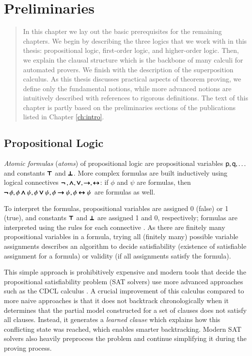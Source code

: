 \chapter{Preliminaries}
\label{ch:pre}

\begin{abstract}
    In this chapter we lay out the basic prerequisites for the remaining
    chapters. We begin by describing the three logics that we work with in this
    thesis: propositional logic, first-order logic, and higher-order logic. Then,
    we explain the clausal structure which is the backbone of many calculi for
    automated provers. We finish with the description of the superposition
    calculus. As this thesis discusses practical aspects of theorem proving, we
    define only the fundamental notions, while more advanced notions are
    intuitively described with references to rigorous definitions. The text of
    this chapter is partly based on the preliminaries sections of the
    publications listed in Chapter \ref{ch:intro}.
\end{abstract}
      
\newpage


\section{Propositional Logic}

\emph{Atomic formulas} (\emph{atoms}) of propositional logic are propositional variables
$\mathsf{p}, \mathsf{q}, \ldots$ and constants $\pmb{\top}$ and $\pmb{\bot}$. More complex
formulas are built inductively using logical connectives $\pmb{\neg\,}, \pmb{\land}, \pmb{\lor},
\pmb{\rightarrow}, \allowbreak \pmb{\leftrightarrow}$: if $\phi$ and $\psi$ are formulas, then $\pmb{\neg\,} \phi, \phi \pmb{\land}
\psi, \allowbreak \phi \pmb{\lor} \psi, \phi \pmb{\rightarrow} \psi, \phi \pmb{\leftrightarrow} \psi$ are formulas as well.

To interpret the formulas, propositional variables are assigned 0 (false) or 1
(true), and constants $\pmb{\top}$ and $\pmb{\bot}$ are assigned 1 and 0, respectively; formulas are interpreted using the rules for each connective
\cite[Sect.~1.4]{hr-00-logic-in-cs}. As there are finitely many propositional
variables in a formula, trying all (finitely many) possible variable assignments
describes an algorithm to decide satisfiability (existence of satisfiable
assignment for a formula) or validity (if all assignments satisfy the formula).

This simple approach is prohibitively expensive and modern tools that
decide the propositional satisfiability problem (SAT solvers) use more advanced
approaches such as the CDCL calculus \cite{mss-96-cdcl}. A crucial improvement of
this calculus compared to more naive approaches is that it does not backtrack
chronologically when it determines that the partial model constructed for a set
of clauses does not satisfy all clauses. Instead, it generates a \emph{learned
clause} which explains how this conflicting state was reached, which enables
smarter backtracking.  Modern SAT solvers also heavily preprocess the problem
and continue simplifying it during the proving process.

